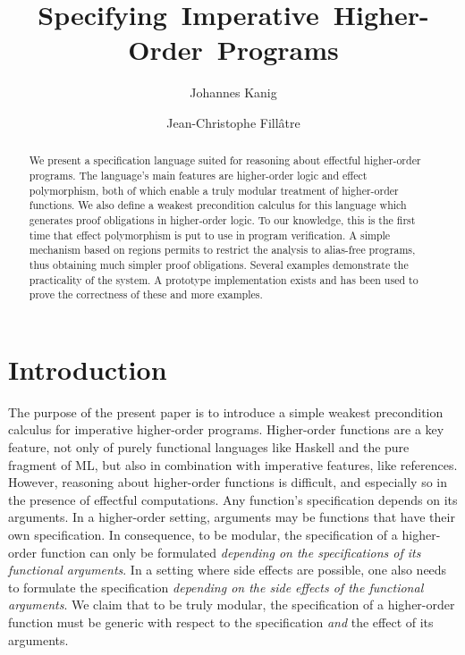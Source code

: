 \documentclass[a4paper]{llncs}
\begin{document}
\title{\mbox{Specifying Imperative Higher-Order Programs}}

\author{Johannes Kanig \and Jean-Christophe Fill\^atre}

% 


\maketitle

\begin{abstract} We present a specification language suited for reasoning
  about effectful higher-order programs. The language's main features are
  higher-order logic and effect polymorphism, both of which enable a truly
  modular treatment of higher-order functions.  We also define a weakest
  precondition calculus for this language which generates proof obligations in
  higher-order logic.  To our knowledge, this is the first time that effect
  polymorphism is put to use in program verification.  A simple mechanism
  based on regions permits to restrict the analysis to alias-free programs,
  thus obtaining much simpler proof obligations. Several examples demonstrate
  the practicality of the system. A prototype implementation exists and has
  been used to prove the correctness of these and more examples.
\end{abstract}

\section{Introduction}

The purpose of the present paper is to introduce a simple weakest precondition
calculus for imperative higher-order programs. Higher-order functions are a
key feature, not only of purely functional languages like Haskell and the pure
fragment of ML, but also in combination with imperative features, like
references. However, reasoning about higher-order functions is difficult, and
especially so in the presence of effectful computations. Any function's
specification depends on its arguments. In a higher-order setting, arguments
may be functions that have their own specification. In consequence, to be
modular, the specification of a higher-order function can only be formulated
{\em depending on the specifications of its functional arguments}. In a
setting where side effects are possible, one also needs to formulate the
specification {\em depending on the side effects of the functional arguments}.
We claim that to be truly modular, the specification of a higher-order
function must be generic with respect to the specification {\em and} the
effect of its arguments.
\end{document}
